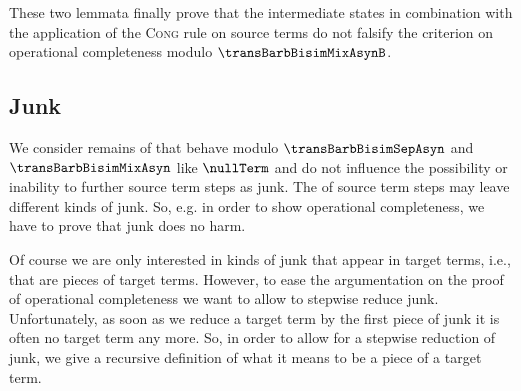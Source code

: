 \documentclass[]{llncs}
\begin{document}
These two lemmata finally prove that the intermediate states in combination with the application of the \textsc{Cong} rule on source terms do not falsify the criterion on operational completeness modulo $ \transBarbBisimMixAsynB $.

\subsection{Junk}

We consider remains of \simulations that behave modulo $ \transBarbBisimSepAsyn $ and $ \transBarbBisimMixAsyn $ like $ \nullTerm $ and do not influence the possibility or inability to \simulate further source term steps as junk. The \simulation of source term steps may leave different kinds of junk. So, e.g. in order to show operational completeness, we have to prove that junk does no harm.

Of course we are only interested in kinds of junk that appear in target terms, i.e., that are pieces of target terms. However, to ease the argumentation on the proof of operational completeness we want to allow to stepwise reduce junk. Unfortunately, as soon as we reduce a target term by the first piece of junk it is often no target term any more. So, in order to allow for a stepwise reduction of junk, we give a recursive definition of what it means to be a piece of a target term.
\end{document}
